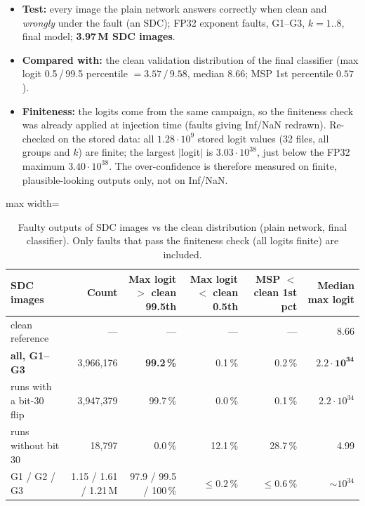 \documentclass[10pt,a4paper]{article}
\begin{document}
\begin{itemize}
  \item \textbf{Test:} every image the plain network answers correctly when clean and \emph{wrongly} under the
        fault (an SDC); FP32 exponent faults, G1--G3, $k=1..8$, final model; \textbf{3.97\,M SDC images}.
  \item \textbf{Compared with:} the clean validation distribution of the final classifier (max logit 0.5\,/\,99.5
        percentile $= 3.57\,/\,9.58$, median $8.66$; MSP 1st percentile $0.57$).
  \item \textbf{Finiteness:} the logits come from the same campaign, so the finiteness check was already applied
        at injection time (faults giving Inf/NaN redrawn). Re-checked on the stored data: all
        $1.28\cdot10^{9}$ stored logit values (32 files, all groups and $k$) are finite; the largest $|$logit$|$ is
        $3.03\cdot10^{38}$, just below the FP32 maximum $3.40\cdot10^{38}$. The over-confidence is therefore
        measured on finite, plausible-looking outputs only, not on Inf/NaN.
\end{itemize}

\begin{table}[H]
\centering\small
\caption{Faulty outputs of SDC images vs the clean distribution (plain network, final classifier). Only faults
that pass the finiteness check (all logits finite) are included.}
\label{tab:overconf}
\begin{adjustbox}{max width=\linewidth}
\begin{tabular}{@{}lrrrrr@{}}
\toprule
SDC images & Count & Max logit $>$ clean 99.5th & Max logit $<$ clean 0.5th & MSP $<$ clean 1st pct & Median max logit \\
\midrule
clean reference                 & ---        & ---              & ---    & ---    & 8.66 \\
\textbf{all, G1--G3}            & 3{,}966{,}176 & \textbf{99.2\,\%} & 0.1\,\% & 0.2\,\% & $\mathbf{2.2\cdot10^{34}}$ \\
runs with a bit-30 flip         & 3{,}947{,}379 & 99.7\,\% & 0.0\,\% & 0.1\,\% & $2.2\cdot10^{34}$ \\
runs without bit 30             & 18{,}797   & 0.0\,\%  & 12.1\,\% & 28.7\,\% & 4.99 \\
G1 / G2 / G3                    & 1.15 / 1.61 / 1.21\,M & 97.9 / 99.5 / 100\,\% & $\le 0.2\,\%$ & $\le 0.6\,\%$ & $\sim 10^{34}$ \\
\bottomrule
\end{tabular}
\end{adjustbox}
\end{table}
\end{document}
